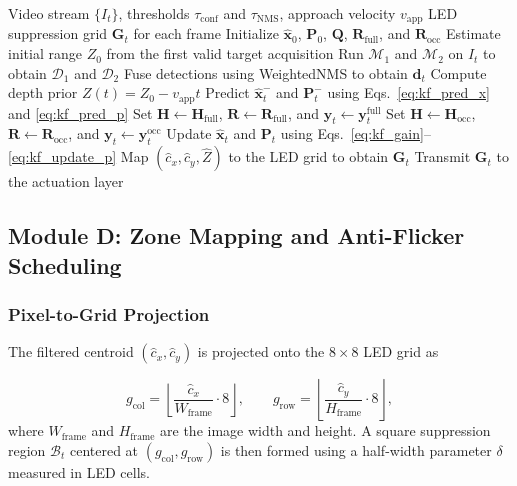 \documentclass[pdflatex,sn-mathphys-num]{sn-jnl}%
\theoremstyle{thmstyleone}%
\theoremstyle{thmstyletwo}%
\theoremstyle{thmstylethree}%
\begin{document}
\begin{algorithm}[t]
\caption{AuraBeam detect-then-track loop with adaptive observation switching}
\label{alg:main}
\begin{algorithmic}[1]
\Require Video stream $\{I_t\}$, thresholds $\tau_{\mathrm{conf}}$ and $\tau_{\mathrm{NMS}}$, approach velocity $v_{\mathrm{app}}$
\Ensure LED suppression grid $\mathbf{G}_t$ for each frame
\State Initialize $\hat{\mathbf{x}}_0$, $\mathbf{P}_0$, $\mathbf{Q}$, $\mathbf{R}_{\mathrm{full}}$, and $\mathbf{R}_{\mathrm{occ}}$
\State Estimate initial range $Z_0$ from the first valid target acquisition
    \State Run $\mathcal{M}_1$ and $\mathcal{M}_2$ on $I_t$ to obtain $\mathcal{D}_1$ and $\mathcal{D}_2$
    \State Fuse detections using WeightedNMS to obtain $\mathbf{d}_t$
    \State Compute depth prior $Z(t) = Z_0 - v_{\mathrm{app}} t$
    \State Predict $\hat{\mathbf{x}}^-_t$ and $\mathbf{P}^-_t$ using Eqs.~\eqref{eq:kf_pred_x} and \eqref{eq:kf_pred_p}
        \State Set $\mathbf{H} \gets \mathbf{H}_{\mathrm{full}}$, $\mathbf{R} \gets \mathbf{R}_{\mathrm{full}}$, and $\mathbf{y}_t \gets \mathbf{y}_t^{\mathrm{full}}$
    \Else
        \State Set $\mathbf{H} \gets \mathbf{H}_{\mathrm{occ}}$, $\mathbf{R} \gets \mathbf{R}_{\mathrm{occ}}$, and $\mathbf{y}_t \gets \mathbf{y}_t^{\mathrm{occ}}$
    \EndIf
    \State Update $\hat{\mathbf{x}}_t$ and $\mathbf{P}_t$ using Eqs.~\eqref{eq:kf_gain}--\eqref{eq:kf_update_p}
    \State Map $(\hat{c}_x, \hat{c}_y, \hat{Z})$ to the LED grid to obtain $\mathbf{G}_t$
    \State Transmit $\mathbf{G}_t$ to the actuation layer
\EndFor
\end{algorithmic}
\end{algorithm}

\subsection{Module D: Zone Mapping and Anti-Flicker Scheduling}
\label{subsec:zone}

\subsubsection{Pixel-to-Grid Projection}

The filtered centroid $(\hat{c}_x, \hat{c}_y)$ is projected onto the $8\times8$ LED grid as

\begin{equation}
g_{\mathrm{col}} = \left\lfloor \frac{\hat{c}_x}{W_{\mathrm{frame}}} \cdot 8 \right\rfloor, \qquad
g_{\mathrm{row}} = \left\lfloor \frac{\hat{c}_y}{H_{\mathrm{frame}}} \cdot 8 \right\rfloor,
\label{eq:zone_map}
\end{equation}
where $W_{\mathrm{frame}}$ and $H_{\mathrm{frame}}$ are the image width and height. A square suppression region $\mathcal{B}_t$ centered at $(g_{\mathrm{col}}, g_{\mathrm{row}})$ is then formed using a half-width parameter $\delta$ measured in LED cells.
\end{document}
